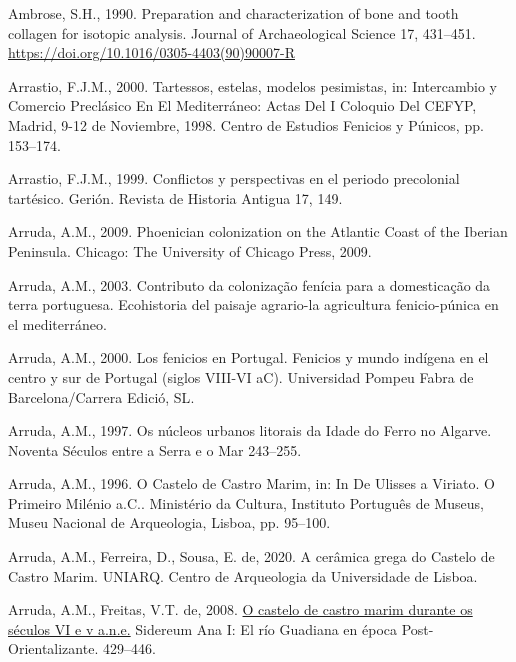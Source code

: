 \documentclass[preprint, 3p, authoryear]{elsarticle} %
\newlength{\cslhangindent}
\newlength{\cslentryspacingunit} %
\newenvironment{CSLReferences}[2] %
 {%
  \setlength{\parindent}{0pt}
  \ifodd #1
  \let\oldpar\par
  \def\par{\hangindent=\cslhangindent\oldpar}
  \fi
  \setlength{\parskip}{#2\cslentryspacingunit}
 }%
 {}
\begin{document}
\hypertarget{refs}{}
\begin{CSLReferences}{1}{0}
\leavevmode{}%
Ambrose, S.H., 1990. Preparation and characterization of bone and tooth collagen for isotopic analysis. Journal of Archaeological Science 17, 431--451. \url{https://doi.org/10.1016/0305-4403(90)90007-R}

\leavevmode{}%
Arrastio, F.J.M., 2000. Tartessos, estelas, modelos pesimistas, in: Intercambio y Comercio Preclásico En El {Mediterráneo}: Actas Del {I} Coloquio Del {CEFYP}, {Madrid}, 9-12 de Noviembre, 1998. {Centro de Estudios Fenicios y Púnicos}, pp. 153--174.

\leavevmode{}%
Arrastio, F.J.M., 1999. Conflictos y perspectivas en el periodo precolonial tartésico. Gerión. Revista de Historia Antigua 17, 149.

\leavevmode{}%
Arruda, A.M., 2009. Phoenician colonization on the {Atlantic Coast} of the {Iberian Peninsula}. {Chicago: The University of Chicago Press, 2009.}

\leavevmode{}%
Arruda, A.M., 2003. Contributo da colonização fenícia para a domesticação da terra portuguesa. Ecohistoria del paisaje agrario-la agricultura fenicio-púnica en el mediterráneo.

\leavevmode{}%
Arruda, A.M., 2000. Los fenicios en {Portugal}. {Fenicios} y mundo indígena en el centro y sur de {Portugal} (siglos {VIII}-{VI aC}). {Universidad Pompeu Fabra de Barcelona/Carrera Edició, SL}.

\leavevmode{}%
Arruda, A.M., 1997. Os núcleos urbanos litorais da {Idade} do {Ferro} no {Algarve}. Noventa Séculos entre a Serra e o Mar 243--255.

\leavevmode{}%
Arruda, A.M., 1996. O {Castelo} de {Castro Marim}, in: In {De Ulisses} a {Viriato}. {O} Primeiro Milénio a.{C}.. {Ministério da Cultura, Instituto Português de Museus, Museu Nacional de Arqueologia}, {Lisboa}, pp. 95--100.

\leavevmode{}%
Arruda, A.M., Ferreira, D., Sousa, E. de, 2020. A cerâmica grega do {Castelo} de {Castro Marim}. {UNIARQ. Centro de Arqueologia da Universidade de Lisboa}.

\leavevmode{}%
Arruda, A.M., Freitas, V.T. de, 2008. \href{https://repositorio.ul.pt/handle/10451/9778}{O castelo de castro marim durante os séculos VI e v a.n.e.} Sidereum Ana I: El río Guadiana en época Post-Orientalizante. 429--446.


\end{CSLReferences}
\end{document}
